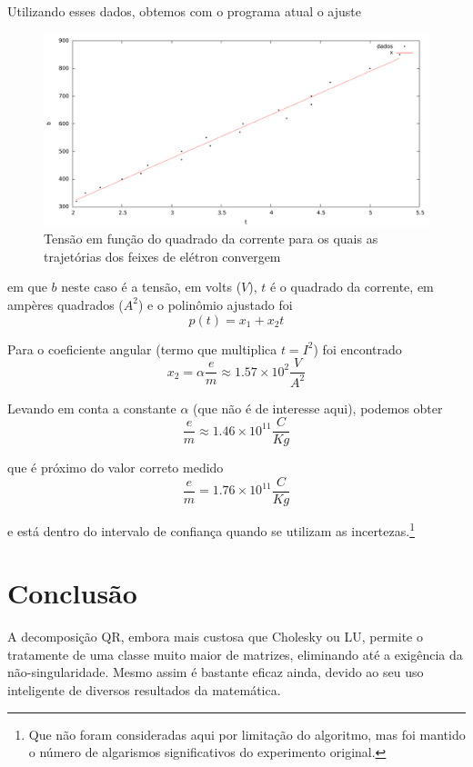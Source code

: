 \documentclass[a4paper,11pt]{article}
\begin{document}
        Utilizando esses dados, obtemos com o programa atual o ajuste
        \begin{figure}[h]
            \caption{Tensão em função do quadrado da corrente para os quais as trajetórias dos feixes de elétron convergem}
            \includegraphics[width=\textwidth]{Dados/cargareduzida.pdf}
        \end{figure}

        em que $b$ neste caso é a tensão, em volts ($V$), $t$ é o quadrado da corrente, em ampères quadrados ($A^2$) e o polinômio ajustado foi
        $$ p(t) = x_1 + x_2t $$

        \newpage
        Para o coeficiente angular (termo que multiplica $t = I^2$) foi encontrado
        $$ x_2 = \alpha \frac{e}{m} \approx 1.57\times 10^2 \frac{V}{A^2}$$

        Levando em conta a constante $\alpha$ (que não é de interesse aqui), podemos obter
        $$ \frac{e}{m} \approx 1.46\times 10^{11} \frac{C}{Kg} $$

        que é próximo do valor correto medido\cite{nist}
        $$ \frac{e}{m} = 1.76\times 10^{11} \frac{C}{Kg} $$

        e está dentro do intervalo de confiança quando se utilizam as incertezas.\footnote{Que não foram consideradas aqui por limitação do algoritmo, mas foi mantido o número de algarismos significativos do experimento original.}
    \section*{Conclusão}
        A decomposição QR, embora mais custosa que Cholesky ou LU, permite o tratamente de uma classe muito maior de matrizes, eliminando até a exigência da não-singularidade.
        Mesmo assim é bastante eficaz ainda, devido ao seu uso inteligente de diversos resultados da matemática.
\end{document}
